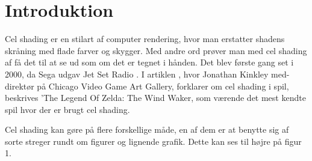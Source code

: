 \newpage
\section{Introduktion}
\setcounter{page}{1}
Cel shading er en stilart af computer rendering, hvor man erstatter shadens skråning med flade farver og skygger. Med andre ord prøver man med cel shading af få det til at se ud som om det er tegnet i hånden. Det blev første gang set i 2000, da Sega udgav Jet Set Radio \cite{tvtropes2016}.
I artiklen \cite{Kinkley2016}, hvor Jonathan Kinkley med-direktør på Chicago Video Game Art Gallery, forklarer om cel shading i spil, beskrives ’The Legend Of Zelda: The Wind Waker, som værende det mest kendte spil hvor der er brugt cel shading. 

Cel shading kan gøre på flere forskellige måde, en af dem er at benytte sig af sorte streger rundt om figurer og lignende grafik. Dette kan ses til højre på figur 1.
